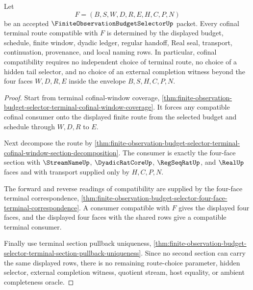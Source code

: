 \begin{theorem}
\label{thm:finite-observation-budget-selector-cofinal-route-choice-freeness}
Let
$$
F=(B,S,W,D,R,E,H,C,P,N)
$$
be an accepted $\FiniteObservationBudgetSelectorUp$ packet. Every cofinal terminal route compatible with $F$ is determined by the displayed budget, schedule, finite window, dyadic ledger, regular handoff, Real seal, transport, continuation, provenance, and local naming rows. In particular, cofinal compatibility requires no independent choice of terminal route, no choice of a hidden tail selector, and no choice of an external completion witness beyond the four faces $W,D,R,E$ inside the envelope $B,S,H,C,P,N$.
\end{theorem}
\begin{proof}
Start from terminal cofinal-window coverage, \autoref{thm:finite-observation-budget-selector-terminal-cofinal-window-coverage}. It forces any compatible cofinal consumer onto the displayed finite route from the selected budget and schedule through $W,D,R$ to $E$.

Next decompose the route by \autoref{thm:finite-observation-budget-selector-terminal-cofinal-window-section-decomposition}. The consumer is exactly the four-face section with $\StreamNameUp$, $\DyadicRatCoreUp$, $\RegSeqRatUp$, and $\RealUp$ faces and with transport supplied only by $H,C,P,N$.

The forward and reverse readings of compatibility are supplied by the four-face terminal correspondence, \autoref{thm:finite-observation-budget-selector-four-face-terminal-correspondence}. A consumer compatible with $F$ gives the displayed four faces, and the displayed four faces with the shared rows give a compatible terminal consumer.

Finally use terminal section pullback uniqueness, \autoref{thm:finite-observation-budget-selector-terminal-section-pullback-uniqueness}. Since no second section can carry the same displayed rows, there is no remaining route-choice parameter, hidden selector, external completion witness, quotient stream, host equality, or ambient completeness oracle.
\end{proof}

